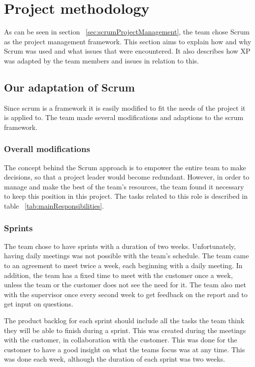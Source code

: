 \section{Project methodology}

\label{sec:scrumDevProcess}
As can be seen in section ~\ref{sec:scrumProjectManagement}, the team chose Scrum as the project management framework. This section aims to explain how and why Scrum was used and what issues that were encountered. It also describes how XP was adapted by the team members and issues in relation to this.

\subsection{Our adaptation of Scrum}
Since scrum is a framework it is easily modified to fit the needs of the project it is applied to. The team made several modifications and adaptions to the scrum framework. 

\subsubsection{Overall modifications}
The concept behind the Scrum approach is to empower the entire team to make decisions, so that a project leader would become redundant. However, in order to manage and make the best of the team's resources, the team found it necessary to keep this position in this project. The tasks related to this role is described in table ~\ref{tab:mainResponsibilities}.

\subsubsection{Sprints}
The team chose to have sprints with a duration of two weeks. Unfortunately, having daily meetings was not possible with the team's schedule. The team came to an agreement to meet twice a week, each beginning with a daily meeting. In addition, the team has a fixed time to meet with the customer once a week, unless the team or the customer does not see the need for it. The team also met with the supervisor once every second week to get feedback on the report and to get input on questions.

The product backlog for each sprint should include all the tasks the team think they will be able to finish during a sprint. This was created during the meetings with the customer, in collaboration with the customer. This was done for the customer to have a good insight on what the teams focus was at any time. This was done each week, although the duration of each sprint was two weeks.

